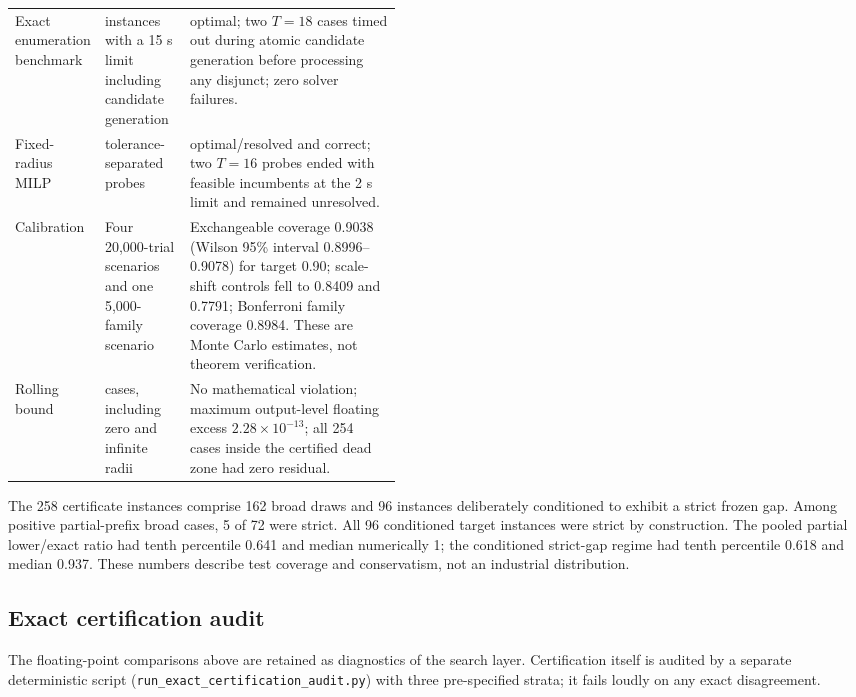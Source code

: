 \documentclass[11pt]{article}
\theoremstyle{definition}
\begin{document}
\begin{table}[p]
\begin{tabularx}{\linewidth}{@{}>{\raggedright\arraybackslash}p{0.23\linewidth}>{\raggedright\arraybackslash}p{0.22\linewidth}>{\raggedright\arraybackslash}X@{}}
Exact enumeration benchmark & 30 instances with a 15 s limit including candidate generation & 28 optimal; two $T=18$ cases timed out during atomic candidate generation before processing any disjunct; zero solver failures. \\
Fixed-radius MILP & 24 tolerance-separated probes & 22 optimal/resolved and correct; two $T=16$ probes ended with feasible incumbents at the 2 s limit and remained unresolved. \\
Calibration & Four 20,000-trial scenarios and one 5,000-family scenario & Exchangeable coverage 0.9038 (Wilson 95\% interval 0.8996--0.9078) for target 0.90; scale-shift controls fell to 0.8409 and 0.7791; Bonferroni family coverage 0.8984. These are Monte Carlo estimates, not theorem verification. \\
Rolling bound & 462 cases, including zero and infinite radii & No mathematical violation; maximum output-level floating excess $2.28\times10^{-13}$; all 254 cases inside the certified dead zone had zero residual. \\
\bottomrule
\end{tabularx}
\end{table}

The 258 certificate instances comprise 162 broad draws and 96 instances deliberately conditioned to exhibit a strict frozen gap. Among positive partial-prefix broad cases, 5 of 72 were strict. All 96 conditioned target instances were strict by construction. The pooled partial lower/exact ratio had tenth percentile 0.641 and median numerically 1; the conditioned strict-gap regime had tenth percentile 0.618 and median 0.937. These numbers describe test coverage and conservatism, not an industrial distribution.

\subsection*{Exact certification audit}

The floating-point comparisons above are retained as diagnostics of the search layer. Certification itself is audited by a separate deterministic script (\texttt{run\_exact\_certification\_audit.py}) with three pre-specified strata; it fails loudly on any exact disagreement.
\end{document}
